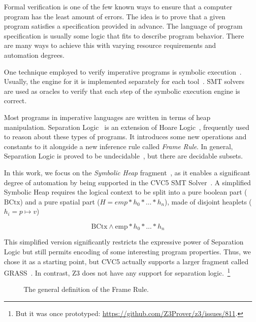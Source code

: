 \documentclass[sigplan,screen,review]{acmart}
\begin{document}
Formal verification is one of the few known ways to ensure that a computer program has the least amount of errors. The idea is to prove that a given program satisfies a specification provided in advance. The language of program specification is usually some logic that fits to describe program behavior. There are many ways to achieve this with varying resource requirements and automation degrees.

One technique employed to verify imperative programs is symbolic execution~\cite{berdine2005symbolic}. Usually, the engine for it is implemented separately for each tool~\cite{DBLP:conf/fmco/BerdineCO05,DBLP:conf/oopsla/DistefanoP08}. SMT solvers are used as oracles to verify that each step of the symbolic execution engine is correct. 

Most programs in imperative languages are written in terms of heap manipulation. Separation Logic~\cite{DBLP:journals/cacm/OHearn19} is an extension of Hoare Logic~\cite{DBLP:journals/cacm/Hoare69}, frequently used to reason about these types of programs. It introduces some new operations and constants to it alongside a new inference rule called \emph{Frame Rule}. In general, Separation Logic is proved to be undecidable~\cite{DBLP:conf/lics/BrotherstonK10}, but there are decidable subsets.

In this work, we focus on the \emph{Symbolic Heap} fragment~\cite{DBLP:conf/fmco/BerdineCO05}, as it enables a significant degree of automation by being supported in the CVC5 SMT Solver~\cite{DBLP:conf/tacas/BarbosaBBKLMMMN22}. A simplified Symbolic Heap requires the logical context to be split into a pure boolean part ($\mbox{BCtx}$) and a pure spatial part ($H = emp * h_0 * \dots * h_n$), made of disjoint heaplets ($h_i = p \mapsto v$)

\[
\text{BCtx} \wedge \text{emp} * h_0 * \dots * h_n
\]

This simplified version significantly restricts the expressive power of Separation Logic but still permits encoding of some interesting program properties. Thus, we chose it as a starting point, but CVC5 actually supports a larger fragment called GRASS~\cite{DBLP:conf/cav/PiskacWZ13}. In contrast, Z3 does not have any support for separation logic.~\footnote{But it was once prototyped: \url{https://github.com/Z3Prover/z3/issues/811}.} 

\begin{figure}
\begin{prooftree}
\end{prooftree}
\caption{The general definition of the Frame Rule.}
\label{fig:framerule}
\end{figure}
\end{document}
